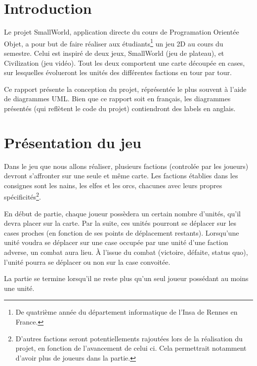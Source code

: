 \section{Introduction}
	Le projet SmallWorld, application directe du cours de Programation Orientée Objet, a pour but de faire réaliser aux étudiants\footnote{De quatrième année du département informatique de l'Insa de Rennes en France.} un jeu 2D au cours du semestre.
	Celui est inspiré de deux jeux, SmallWorld (jeu de plateau), et Civilization (jeu vidéo).
	Tout les deux comportent une carte découpée en cases, sur lesquelles évolueront les unités des différentes factions en tour par tour.

	Ce rapport présente la conception du projet, réprésentée le plus souvent à l'aide de diagrammes UML. Bien que ce rapport soit en français, les diagrammes présentés (qui reflètent le code du projet) contiendront des labels en anglais.

\section{Présentation du jeu}
	Dans le jeu que nous allons réaliser, plusieurs factions (controlée par les joueurs) devront s'affronter sur une seule et même carte. Les factions établies dans les consignes sont les nains, les elfes et les orcs, chacunes avec leurs propres spécificités\footnote{D'autres factions seront potentiellements rajoutées lors de la réalisation du projet, en fonction de l'avancement de celui ci. Cela permettrait notamment d'avoir plus de joueurs dans la partie.}.

	En début de partie, chaque joueur possèdera un certain nombre d'unités, qu'il devra placer sur la carte. Par la suite, ces unités pourront se déplacer sur les cases proches (en fonction de ses points de déplacement restants).
	Lorsqu'une unité voudra se déplacer sur une case occupée par une unité d'une faction adverse, un combat aura lieu. \`A l'issue du combat (victoire, défaite, status quo), l'unité pourra se déplacer ou non sur la case convoitée.

	La partie se termine lorsqu'il ne reste plus qu'un seul joueur possédant au moins une unité.















